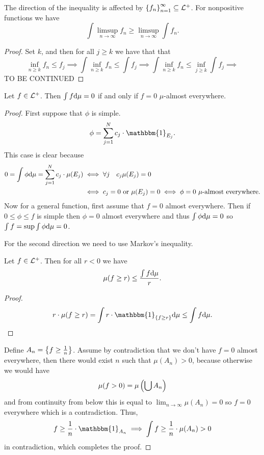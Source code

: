 \documentclass[11pt,a4paper]{article}
\begin{document}
\begin{remark}
  The direction of the inequality is affected by
  $\left\{f_n\right\}_{n=1}^{\infty} \subseteq \mathcal{L}^+$.
  For nonpositive functions we have 
  \[
    \int \limsup_{n \to \infty} f_n \geq
    \limsup_{n \to \infty} \int f_n.
  \]
\end{remark}
\begin{proof}
  Set $k$, and then for all $j \geq k$ we have that that
  \[
    \inf_{n \geq k} f_n \le f_j \implies
    \int \inf_{n \geq k} f_n \le \int f_j \implies
    \int \inf_{n \geq k} f_n \le \inf_{j \geq k} \int f_j \implies
  \]
  TO BE CONTINUED
\end{proof}

\begin{proposition}
  Let $f \in \mathcal{L}^+$.
  Then $\int f \mathrm{d} \mu = 0$ if and only if $f = 0$ $\mu$-almost everywhere.
\end{proposition}
\begin{proof}
  First suppose that $\phi$ is simple.
  \[
    \phi= \sum_{j=1}^{N} c_j \cdot \mathbbm{1}_{E_j}.
  \]
  This case is clear because
  \begin{align*}
    0 =
    \int \phi \mathrm{d} \mu =
    \sum_{j=1}^{N} c_j \cdot \mu(E_j) &\iff
    \forall j \quad c_j \mu(E_j) = 0 \\ &\iff
    c_j = 0 \text{ or } \mu(E_j) = 0 \iff
    \phi = 0 \text{ $\mu$-almost everywhere}.
  \end{align*}
  Now for a general function, first assume that $f = 0$ almost everywhere.
  Then if $0 \le \phi \le f$ is simple then $\phi = 0$ almost everywhere
  and thus $\int \phi \mathrm{d} \mu = 0$ so $\int f = \sup \int \phi \mathrm{d} \mu = 0$.
  
  For the second direction we need to use Markov's inequality.
  \begin{lemma}
    Let $f \in \mathcal{L}^+$. Then for all $r < 0$ we have
    \[
      \mu(f \geq r) \le \frac{\int f \mathrm{d} \mu}{r}.
    \]
  \end{lemma}
  \begin{proof}
    \[
      r \cdot \mu(f \geq r) =
      \int r \cdot \mathbbm{1}_{\set{f \geq r}} \dmu \le
      \int f \dmu.
    \]
  \end{proof}
  Define $A_n = \left\{f \geq \frac{1}{n}\right\}$.
  Assume by contradiction that we don't have $f = 0$ almost everywhere,
  then there would exist $n$ such that $\mu(A_n) > 0$, because otherwise
  we would have
  \[
    \mu(f > 0) = \mu\del{\bigcup A_n}
  \]
  and from continuity from below this is equal to
  $\lim_{n \to \infty} \mu(A_n) = 0$ so $f = 0$ everywhere which is a
  contradiction.
  Thus,
  \[
    f \geq \frac{1}{n} \cdot \mathbbm{1}_{A_n} \implies
    \int f \geq \frac{1}{n} \cdot \mu(A_n) > 0
  \]
  in contradiction, which completes the proof.
\end{proof}
\end{document}
